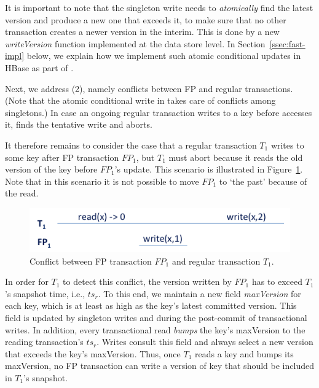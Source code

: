 It is important to note that the singleton write needs to \emph{atomically} find the latest version and produce a new one that exceeds it, 
to make sure that no other transaction creates a newer version in the interim. This is done by a new \emph{writeVersion} function implemented 
at the data store level. In Section~\ref{ssec:fast-impl}
below, we explain how we implement such atomic conditional updates in HBase as part of \sys. 

Next, we address (2), namely conflicts between FP and regular transactions.
(Note that the atomic conditional write in  takes care of conflicts among singletons.)
In case an ongoing regular transaction writes to a key before  accesses it, 
 finds the tentative write and aborts. 

It therefore remains to consider the case that
a regular transaction $T_1$ writes to some key after FP transaction $FP_1$, but $T_1$ must abort because
it reads the old version of the key before $FP_1$'s update. This scenario is illustrated in Figure~\ref{fig:why-bump}. 
Note that in this scenario it is not possible to move $FP_1$ to `the past' because of the read.

\begin{figure}[htb]
\includegraphics[width=\columnwidth]{figs/FP-why-bump}
\caption{Conflict between FP transaction $FP_1$ and regular transaction $T_1$.}
\label{fig:why-bump}
\end{figure}

In order for $T_1$ to detect this 
conflict, the version written by $FP_1$ has to exceed $T_1$'s snapshot time, i.e., $ts_r$.
To this end, we maintain a new field \emph{maxVersion} for each key, which is at least as 
high as the key's latest committed version. 
This field is updated by singleton writes and during the post-commit of transactional writes.
In addition, every transactional read \emph{bumps} the key's {maxVersion}
to the reading transaction's $ts_r$. 
Writes consult this field and always select a new version that exceeds the key's {maxVersion}.
Thus, once $T_1$ reads a key and bumps its {maxVersion}, 
no FP transaction can write a version of key that should be 
included in $T_1$'s snapshot.

